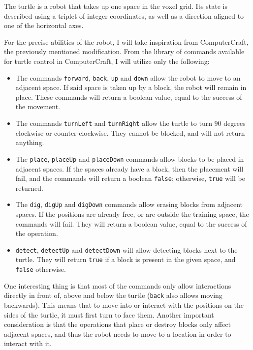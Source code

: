 \documentclass{report}
\begin{document}
The turtle is a robot that takes up one space in the voxel grid. Its state is described using a triplet of integer coordinates, as well as a direction aligned to one of the horizontal axes.

For the precise abilities of the robot, I will take inspiration from ComputerCraft, the previously mentioned modification. From the library of commands available for turtle control in ComputerCraft, I will utilize only the following:

\begin{itemize}
    \item The commands \texttt{forward}, \texttt{back}, \texttt{up} and \texttt{down} allow the robot to move to an adjacent space. If said space is taken up by a block, the robot will remain in place. These commands will return a boolean value, equal to the success of the movement.
    \item The commands \texttt{turnLeft} and \texttt{turnRight} allow the turtle to turn 90 degrees clockwise or counter-clockwise. They cannot be blocked, and will not return anything.
    \item The \texttt{place}, \texttt{placeUp} and \texttt{placeDown} commands allow blocks to be placed in adjacent spaces. If the spaces already have a block, then the placement will fail, and the commands will return a boolean \texttt{false}; otherwise, \texttt{true} will be returned.
    \item The \texttt{dig}, \texttt{digUp} and \texttt{digDown} commands allow erasing blocks from adjacent spaces. If the positions are already free, or are outside the training space, the commands will fail. They will return a boolean value, equal to the success of the operation.
    \item \texttt{detect}, \texttt{detectUp} and \texttt{detectDown} will allow detecting blocks next to the turtle. They will return \texttt{true} if a block is present in the given space, and \texttt{false} otherwise.
\end{itemize}

One interesting thing is that most of the commands only allow interactions directly in front of, above and below the turtle (\texttt{back} also allows moving backwards). This means that to move into or interact with the positions on the sides of the turtle, it must first turn to face them. Another important consideration is that the operations that place or destroy blocks only affect adjacent spaces, and thus the robot needs to move to a location in order to interact with it.
\end{document}
